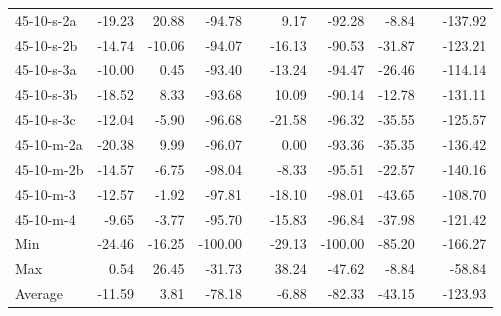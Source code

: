 \begin{table}[h]
\begin{tabular}{lrrrrrrrrr}
    45-10-s-2a & -19.23 & 20.88 & -94.78 && 9.17 & -92.28 & -8.84 && -137.92 \\
    45-10-s-2b & -14.74 & -10.06 & -94.07 && -16.13 & -90.53 & -31.87 && -123.21 \\
    45-10-s-3a & -10.00 & 0.45 & -93.40 && -13.24 & -94.47 & -26.46 && -114.14 \\
    45-10-s-3b & -18.52 & 8.33 & -93.68 && 10.09 & -90.14 & -12.78 && -131.11 \\
    45-10-s-3c & -12.04 & -5.90 & -96.68 && -21.58 & -96.32 & -35.55 && -125.57 \\
    45-10-m-2a & -20.38 & 9.99 & -96.07 && 0.00 & -93.36 & -35.35 && -136.42 \\
    45-10-m-2b & -14.57 & -6.75 & -98.04 && -8.33 & -95.51 & -22.57 && -140.16 \\
    45-10-m-3 & -12.57 & -1.92 & -97.81 && -18.10 & -98.01 & -43.65 && -108.70 \\
    45-10-m-4 & -9.65 & -3.77 & -95.70 && -15.83 & -96.84 & -37.98 && -121.42 \\
    \midrule
    Min & -24.46 & -16.25 & -100.00 && -29.13 & -100.00 & -85.20 && -166.27 \\
    Max & 0.54 & 26.45 & -31.73 && 38.24 & -47.62 & -8.84 && -58.84 \\
    Average & -11.59 & 3.81 & -78.18 && -6.88 & -82.33 & -43.15 && -123.93 \\
    \bottomrule
\end{tabular}
\label{table:comparisonofqualities}
\end{table}

